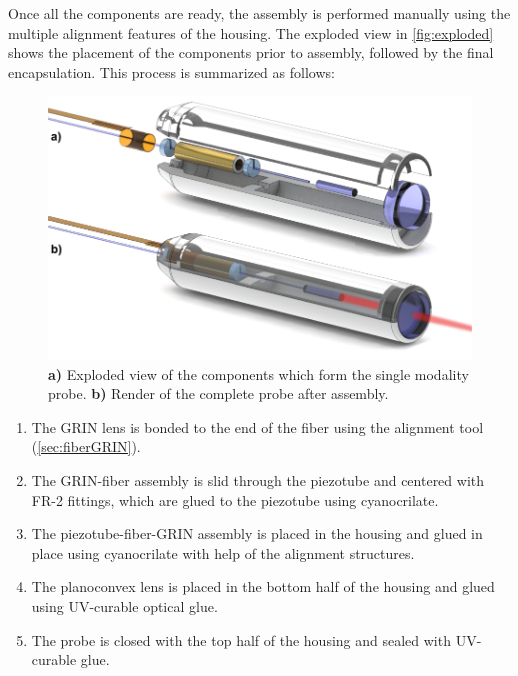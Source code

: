 Once all the components are ready, the assembly is performed manually using the multiple alignment features of the housing. The exploded view in \autoref{fig:exploded} shows the placement of the components prior to assembly, followed by the final encapsulation. This process is summarized as follows:

\begin{figure}[h!]\centering \includegraphics{figures/40_Fabrication/Assy/explodedRender/explodedRenderLaser.pdf}
      \caption{\textbf{a)} Exploded view of the components which form the single modality probe.
      \textbf{b)} Render of the complete probe after assembly.}
      \label{fig:exploded}
\end{figure}

\begin{enumerate}
\item The GRIN lens is bonded to the end of the fiber using the alignment tool (\autoref{sec:fiberGRIN}).
\item The GRIN-fiber assembly is slid through the piezotube and centered with FR-2 fittings, which are glued to the piezotube using cyanocrilate.
\item The piezotube-fiber-GRIN assembly is placed in the housing and glued in place using cyanocrilate with help of the alignment structures.
\item The planoconvex lens is placed in the bottom half of the housing and glued using UV-curable optical glue.
\item The probe is closed with the top half of the housing and sealed with UV-curable glue.
\end{enumerate}

